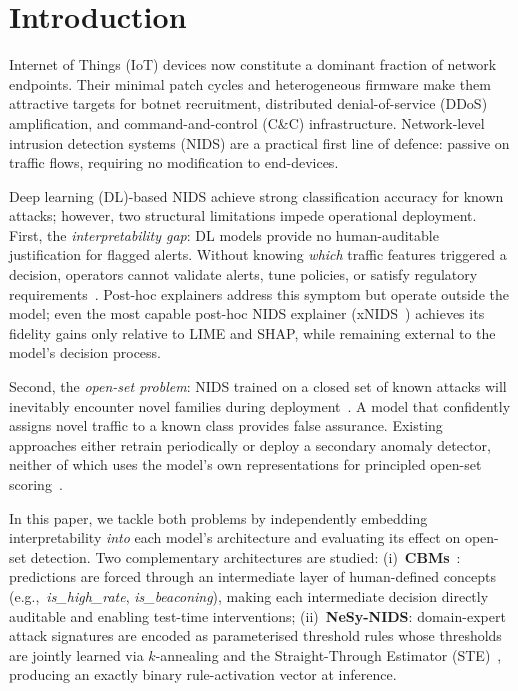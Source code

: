 \documentclass[conference]{IEEEtran}
\begin{document}
\section{Introduction}

Internet of Things (IoT) devices now constitute a dominant fraction of
network endpoints. Their minimal patch cycles and heterogeneous firmware
make them attractive targets for botnet recruitment, distributed
denial-of-service (DDoS) amplification, and command-and-control (C\&C)
infrastructure. Network-level intrusion detection systems (NIDS) are a
practical first line of defence: passive on traffic flows, requiring no
modification to end-devices.

Deep learning (DL)-based NIDS achieve strong classification accuracy
for known attacks; however, two structural limitations impede
operational deployment. First, the \emph{interpretability gap}: DL
models provide no human-auditable justification for flagged alerts.
Without knowing \emph{which} traffic features triggered a decision,
operators cannot validate alerts, tune policies, or satisfy regulatory
requirements~\cite{rudin2019stop,arp2022dos}. Post-hoc explainers
address this symptom but operate outside the model; even the most
capable post-hoc NIDS explainer (xNIDS~\cite{wei2023xnids}) achieves
its fidelity gains only relative to LIME and SHAP, while remaining
external to the model's decision process.

Second, the \emph{open-set problem}: NIDS trained on a closed set of
known attacks will inevitably encounter novel families during
deployment~\cite{arp2022dos}. A model that confidently assigns novel
traffic to a known class provides false assurance. Existing approaches
either retrain periodically or deploy a secondary anomaly detector,
neither of which uses the model's own representations for principled
open-set scoring~\cite{han2023owad}.

In this paper, we tackle both problems by independently embedding
interpretability \emph{into} each model's architecture and evaluating
its effect on open-set detection. Two complementary architectures are
studied: (i)~\textbf{CBMs}~\cite{koh2020concept}: predictions are
forced through an intermediate layer of human-defined concepts
(e.g.,\ \textit{is\_high\_rate}, \textit{is\_beaconing}), making each
intermediate decision directly auditable and enabling test-time
interventions; (ii)~\textbf{NeSy-NIDS}: domain-expert attack
signatures are encoded as parameterised threshold rules whose
thresholds are jointly learned via $k$-annealing and the
Straight-Through Estimator (STE)~\cite{bengio2013ste,liu2023reinmax},
producing an exactly binary rule-activation vector at inference.
\end{document}
